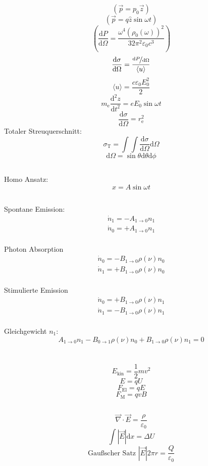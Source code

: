 \documentclass[12pt]{report}
\newcommand{\vabla}{\vec{\nabla}}
\newcommand{\vepsilon}{\varepsilon}
\newcommand{\dd}{\mathrm{d}}
\begin{document}
\[(\vec{p}=p_0\vec{z})\]
\[(\vec{p}=q\hat{z}\sin\omega t)\]
\[\left(\frac{\dd P}{\dd\Omega}=\frac{\omega^4(\rho_0(\omega))^2}{32\pi^2\vepsilon_0c^3}\right)\]
\[\frac{\dd\sigma}{\dd\Omega}=\frac{\nicefrac{\dd P}{\dd\Omega}}{\langle u\rangle}\]
\[\langle u\rangle=\frac{c\vepsilon_0E_0^2}{2}\]
\[m_\mathrm{e}\frac{\dd^2z}{\dd t^2}=eE_0\sin\omega t\]
\[\frac{\dd\sigma}{\dd\Omega}=r_\mathrm{e}^2\]
Totaler Streuquerschnitt:
\[\sigma_\mathrm{T}=\int\int\frac{\dd\sigma}{\dd\Omega}\dd\Omega\]
\[\dd\Omega=\sin\theta\dd\theta\dd\phi\]

\subsection{}
Homo Ansatz: \[x=A\sin\omega t\]

\subsection{}
Spontane Emission: \begin{align*}\dot{n}_1=-A_{1\to0}n_1\\\dot{n}_0=+A_{1\to0}n_1\end{align*}\\
Photon Absorption\begin{align*}\dot{n}_0=-B_{1\to0}\rho(\nu)n_0\\\dot{n}_1=+B_{1\to0}\rho(\nu)n_0\end{align*}\\
Stimulierte Emission\begin{align*}\dot{n}_0=+B_{1\to0}\rho(\nu)n_1\\\dot{n}_1=-B_{1\to0}\rho(\nu)n_1\end{align*}\\
Gleichgewicht $n_1$:
\[A_{1\to0}n_1-B_{0\to1}\rho(\nu)n_0+B_{1\to0}\rho(\nu)n_1=0\]

\section{}

\subsection{}
\[E_\mathrm{kin}=\frac{1}{2}mv^2\]
\[E=qU\]
\[F_\mathrm{El}=qE\]
\[F_\mathrm{M}=qvB\]

\subsection{}
\[\vabla\cdot\vec{E}=\frac{\rho}{\vepsilon_0}\]
\[\int|\vec{E}|\dd x=\Delta U\]
\[\textrm{Gau\ss scher Satz }|\vec{E}|2\pi r=\frac{Q}{\vepsilon_0}\]
\end{document}

